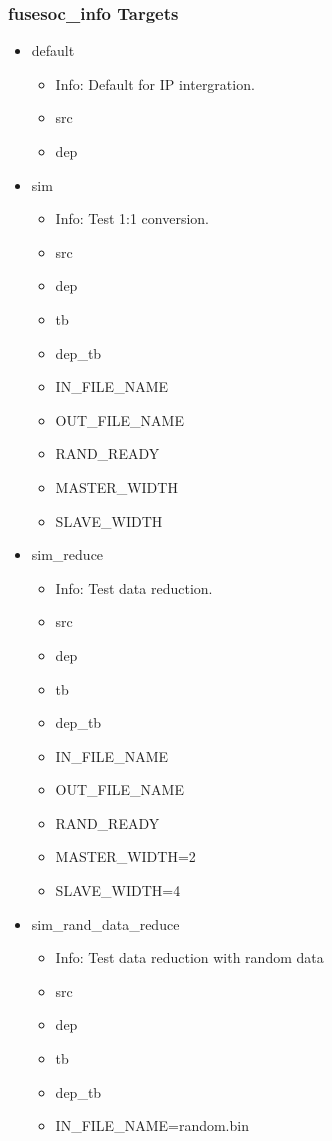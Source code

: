 \subsubsection{fusesoc\_info Targets}
\begin{itemize}
\item default
	\begin{itemize}
	\item[$\space$] Info: Default for IP intergration.
	\item src
	\item dep
	\end{itemize}
\item sim
	\begin{itemize}
	\item[$\space$] Info: Test 1:1 conversion.
	\item src
	\item dep
	\item tb
	\item dep\_tb
	\item IN\_FILE\_NAME
	\item OUT\_FILE\_NAME
	\item RAND\_READY
	\item MASTER\_WIDTH
	\item SLAVE\_WIDTH
	\end{itemize}
\item sim\_reduce
	\begin{itemize}
	\item[$\space$] Info: Test data reduction.
	\item src
	\item dep
	\item tb
	\item dep\_tb
	\item IN\_FILE\_NAME
	\item OUT\_FILE\_NAME
	\item RAND\_READY
	\item MASTER\_WIDTH=2
	\item SLAVE\_WIDTH=4
	\end{itemize}
\item sim\_rand\_data\_reduce
	\begin{itemize}
	\item[$\space$] Info: Test data reduction with random data
	\item src
	\item dep
	\item tb
	\item dep\_tb
	\item IN\_FILE\_NAME=random.bin

\end{itemize}
\end{itemize}
